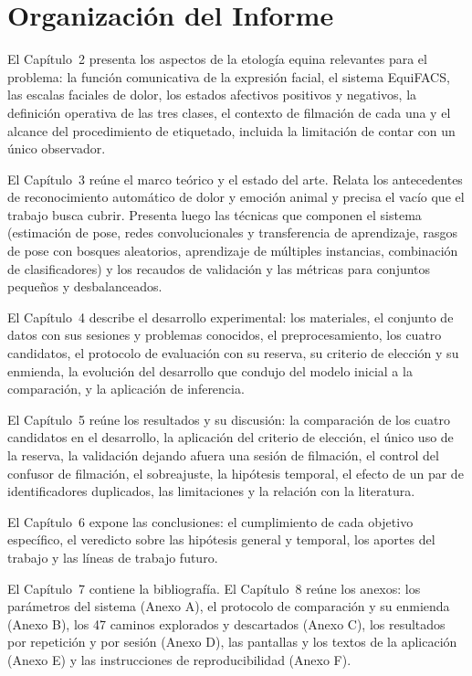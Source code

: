 \section{Organización del Informe}
El Capítulo~2 presenta los aspectos de la etología equina relevantes para el problema: la función comunicativa de la expresión facial, el sistema EquiFACS, las escalas faciales de dolor, los estados afectivos positivos y negativos, la definición operativa de las tres clases, el contexto de filmación de cada una y el alcance del procedimiento de etiquetado, incluida la limitación de contar con un único observador.

El Capítulo~3 reúne el marco teórico y el estado del arte. Relata los antecedentes de reconocimiento automático de dolor y emoción animal y precisa el vacío que el trabajo busca cubrir. Presenta luego las técnicas que componen el sistema (estimación de pose, redes convolucionales y transferencia de aprendizaje, rasgos de pose con bosques aleatorios, aprendizaje de múltiples instancias, combinación de clasificadores) y los recaudos de validación y las métricas para conjuntos pequeños y desbalanceados.

El Capítulo~4 describe el desarrollo experimental: los materiales, el conjunto de datos con sus sesiones y problemas conocidos, el preprocesamiento, los cuatro candidatos, el protocolo de evaluación con su reserva, su criterio de elección y su enmienda, la evolución del desarrollo que condujo del modelo inicial a la comparación, y la aplicación de inferencia.

El Capítulo~5 reúne los resultados y su discusión: la comparación de los cuatro candidatos en el desarrollo, la aplicación del criterio de elección, el único uso de la reserva, la validación dejando afuera una sesión de filmación, el control del confusor de filmación, el sobreajuste, la hipótesis temporal, el efecto de un par de identificadores duplicados, las limitaciones y la relación con la literatura.

El Capítulo~6 expone las conclusiones: el cumplimiento de cada objetivo específico, el veredicto sobre las hipótesis general y temporal, los aportes del trabajo y las líneas de trabajo futuro.

El Capítulo~7 contiene la bibliografía. El Capítulo~8 reúne los anexos: los parámetros del sistema (Anexo A), el protocolo de comparación y su enmienda (Anexo B), los 47 caminos explorados y descartados (Anexo C), los resultados por repetición y por sesión (Anexo D), las pantallas y los textos de la aplicación (Anexo E) y las instrucciones de reproducibilidad (Anexo F).
